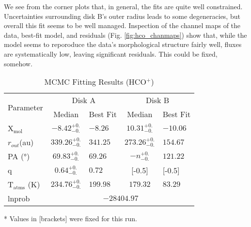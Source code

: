 We see from the corner plots that, in general, the fits are quite well constrained. Uncertainties surrounding disk B's outer radius leads to some degeneracies, but overall this fit seems to be well managed. Inspection of the channel maps of the \hco data, best-fit model, and residuals (Fig. \ref{fig:hco_chanmaps}) show that, while the model seems to reporoduce the data's morphological structure fairly well, fluxes are systematically low, leaving significant residuals. This could be fixed, somehow.

\begin{table}[h!]
  \centering
  \begin{threeparttable}
    \caption{MCMC Fitting Results (HCO$^+$)}
    \label{table:fit_hco}
    \renewcommand{\arraystretch}{1.2}
    \begin{tabular}{l c l c l }
      \toprule \toprule
      \multirow{2}{*}{Parameter} & \multicolumn{2}{c}{Disk A} & \multicolumn{2}{c}{Disk B} \\
                                 & Median & Best Fit          & Median & Best Fit \\
      \midrule %
      X$_\text{mol}$            & $ -8.42_{-0.} ^{+0.}$ & $-8.26$    & $ 10.31_{-0.} ^{+0.}$ & $-10.06$ \\
      $r_{out}$(\si{au})        & $ 339.26_{-0.} ^{+0.}$ & $341.25$    & $ 273.26_{-0.} ^{+0.}$  & $154.67$    \\
      PA  (\si{\degree})        & $ 69.83_{-0.} ^{+0.}$ & $69.26$  & $ -n _{-0.} ^{+0.}$  & $121.22$  \\
      q                         & $ 0.64_{-0.} ^{+0.}$ & $0.72$     & [-0.5]  & [-0.5]  \\
      T$_\text{atms}$ (\si{\K}) & $ 234.76_{-0.} ^{+0.}$ & $199.98 $  & $179.32$  & $83.29$  \\
      lnprob                    & \multicolumn{4}{c}{$-28404.97$} \\
      \bottomrule
    \end{tabular}
    \begin{tablenotes}\footnotesize
      \item[*] Values in [brackets] were fixed for this run.
    \end{tablenotes}
  \end{threeparttable}
\end{table}








